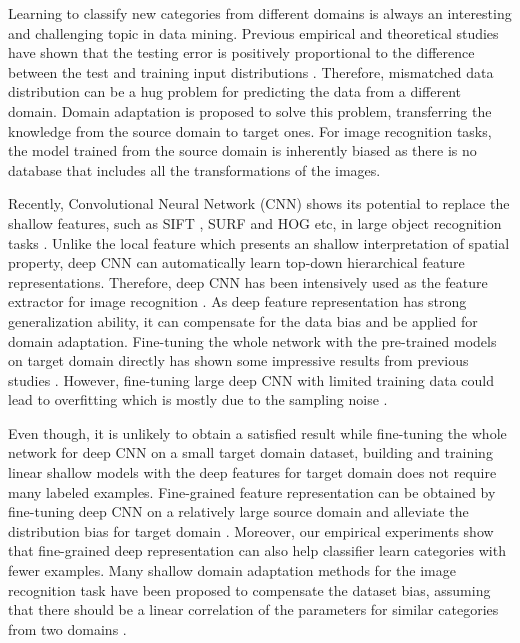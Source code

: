 ﻿Learning to classify new categories from different domains is always an interesting and challenging topic in data mining.
Previous empirical and theoretical studies have shown that the testing error is positively proportional to the difference between the test and training input distributions \cite{ben2007analysis} \cite{blitzer2008learning}. Therefore, mismatched data distribution can be a hug problem for predicting the data from a different domain. Domain adaptation is proposed to solve this problem, transferring the knowledge from the source domain to target ones. For image recognition tasks, the model trained from the source domain is inherently biased as there is no database that includes all the transformations of the images. 

Recently, Convolutional Neural Network (CNN) shows its potential to replace the shallow features, such as SIFT \cite{lowe1999object}, SURF \cite{bay2006surf} and HOG \cite{dalal2005histograms} etc, in large object recognition tasks \cite{krizhevsky2012imagenet} \cite{zeiler2014visualizing} \cite{simonyan2014very}. Unlike the local feature which presents an shallow interpretation of spatial property, deep CNN can automatically learn top-down hierarchical feature representations. Therefore, deep CNN has been intensively used as the feature extractor for image recognition \cite{farabet2013learning}. As deep feature representation has strong generalization ability, it can compensate for the data bias and be applied for domain adaptation. Fine-tuning the whole network with the pre-trained models on target domain directly has shown some impressive results from previous studies \cite{Chatfield14} \cite{zeiler2014visualizing} \cite{hoffman2013one} \cite{NIPS2014_Zhou}.
However, fine-tuning large deep CNN with limited training data could lead to overfitting which is mostly due to the sampling noise \cite{srivastava2014dropout}.

Even though, it is unlikely to obtain a satisfied result while fine-tuning the whole network for deep CNN on a small target domain dataset, building and training linear shallow models with the deep features for target domain does not require many labeled examples. Fine-grained feature representation can be obtained by fine-tuning deep CNN on a relatively large source domain and alleviate the distribution bias for target domain \cite{zhang2014part}. Moreover, our empirical experiments show that fine-grained deep representation can also help classifier learn categories with fewer examples. Many shallow domain adaptation methods for the image recognition task have been proposed to compensate the dataset bias, assuming that there should be a linear correlation of the parameters for similar categories from two domains \cite{daume2009frustratingly} \cite{yang2007adapting} \cite{aytar2011tabula}. 

